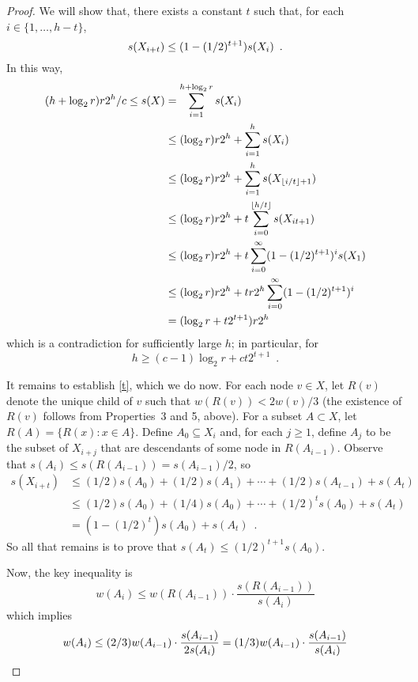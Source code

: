 \documentclass{patmorin}
\begin{document}
\begin{proof}
  We will show that, there exists a constant $t$ such that, 
  for each $i\in\{1,\ldots,h-t\}$,  
  \begin{equation}
     s(X_{i+t}) \le (1-(1/2)^{t+1}) s(X_i) \enspace . \eqlabel{t}
  \end{equation}
  In this way, 
  \begin{align*}
     (h+\log_2 r)r2^{h}/c 
        \le s(X) & = \sum_{i=1}^{h+\log_2 r} s(X_i) \\
           &\le (\log_2 r)r2^{h}+\sum_{i=1}^{h} s(X_i) \\
           &\le (\log_2 r)r2^{h}+\sum_{i=1}^{h} s(X_{{\lfloor i/t \rfloor}+1}) \\
           &\le (\log_2 r)r2^{h}+t\sum_{i=0}^{{\lfloor h/t \rfloor}} s(X_{it+1}) \\
           &\le (\log_2 r)r2^{h}+t\sum_{i=0}^{\infty} (1-(1/2)^{t+1})^i s(X_1) \\
           &\le (\log_2 r)r2^{h}+tr2^{h}\sum_{i=0}^{\infty} (1-(1/2)^{t+1})^i  \\
           & = (\log_2 r+t2^{t+1})r2^{h} 
  \end{align*}
  which is a contradiction for sufficiently large $h$; in particular, for 
  \[    
        h \ge (c-1)\log_2 r+ ct2^{t+1} \enspace . 
  \]

  It remains to establish \eqref{t}, which we do now.  For each node
  $v\in X$, let $R(v)$ denote the unique child of $v$ such that $w(R(v))
  < 2w(v)/3$ (the existence of $R(v)$ follows from Properties~3 and
  5, above).  For a subset $A\subset X$, let $R(A)=\{R(x):x\in A\}$.
  Define $A_0\subseteq X_i$ and, for each $j\ge 1$, define $A_j$
  to be the subset of $X_{i+j}$ that are descendants of some node in
  $R(A_{i-1})$.  Observe that $s(A_i) \le s(R(A_{i-1})) = s(A_{i-1})/2$,
  so 
   \begin{align*}
      s(X_{i+t}) 
         &\le (1/2)s(A_0) + (1/2)s(A_1) + \cdots + (1/2)s(A_{t-1}) + s(A_t) \\
         &\le (1/2)s(A_0) + (1/4)s(A_0) + \cdots + (1/2)^t s(A_{0}) + s(A_t) \\
         &  = (1-(1/2)^t)s(A_0) + s(A_t) \enspace .
   \end{align*}
  So all that remains is to prove that $s(A_t)\le (1/2)^{t+1}s(A_0)$.

  Now, the key inequality is 
  \begin{equation}
      w(A_i) \le w(R(A_{i-1}))\cdot\frac{s(R(A_{i-1}))}{s(A_i)}
  \end{equation}
  which implies
  \begin{equation}
       w(A_i) \le (2/3)w(A_{i-1})\cdot\frac{s(A_{i-1})}{2s(A_i)}
             = (1/3)w(A_{i-1})\cdot\frac{s(A_{i-1})}{s(A_i)}
             \eqlabel{strings}
  \end{equation}


\end{proof}
\end{document}
